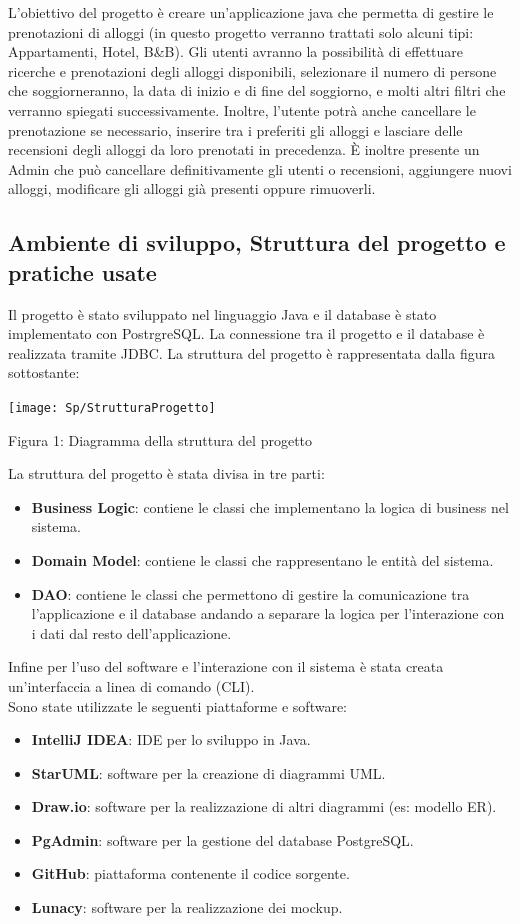 \documentclass[10pt]{article}
\begin{document}
L'obiettivo del progetto è creare un'applicazione java che permetta di gestire le prenotazioni di alloggi (in questo progetto verranno trattati solo alcuni tipi: Appartamenti, Hotel, B\&B). Gli utenti avranno la possibilità di effettuare ricerche e prenotazioni degli alloggi disponibili, selezionare il numero di persone che soggiorneranno, la data di inizio e di fine del soggiorno, e molti altri filtri che verranno spiegati successivamente. Inoltre, l'utente potrà anche cancellare le prenotazione se necessario, inserire tra i preferiti gli alloggi e lasciare delle recensioni degli alloggi da loro prenotati in precedenza. \`E inoltre presente un Admin che può cancellare definitivamente gli utenti o recensioni, aggiungere nuovi alloggi, modificare gli alloggi già presenti oppure rimuoverli.

\subsection{Ambiente di sviluppo, Struttura del progetto e pratiche usate}

Il progetto è stato sviluppato nel linguaggio Java e il database è stato implementato con PostrgreSQL. La connessione tra il progetto e il database è realizzata tramite JDBC. La struttura del progetto è rappresentata dalla figura sottostante: 
\begin{center}
\texttt{[image: Sp/StrutturaProgetto]}
\par\medskip
Figura 1: Diagramma della struttura del progetto
\par\medskip
\end{center}
La struttura del progetto è stata divisa in tre parti:
\begin{itemize}
	\item \textbf{Business Logic}: contiene le classi che implementano la logica di business nel sistema.
	\item \textbf{Domain Model}: contiene le classi che rappresentano le entità del sistema.
	\item \textbf{DAO}: contiene le classi che permettono di gestire la comunicazione tra l'applicazione e il database andando a separare la logica per l'interazione con i dati dal resto dell'applicazione.
\end{itemize}
Infine per l'uso del software e l'interazione con il sistema è stata creata un'interfaccia a linea di comando (CLI).\\
Sono state utilizzate le seguenti piattaforme e software:
\begin{itemize}
\item \textbf{IntelliJ IDEA}: IDE per lo sviluppo in Java.
\item \textbf{StarUML}: software per la creazione di diagrammi UML.
\item \textbf{Draw.io}: software per la realizzazione di altri diagrammi (es: modello ER).
\item \textbf{PgAdmin}: software per la gestione del database PostgreSQL.
\item \textbf{GitHub}: piattaforma contenente il codice sorgente.
\item \textbf{Lunacy}: software per la realizzazione dei mockup.
\end{itemize}
\end{document}
